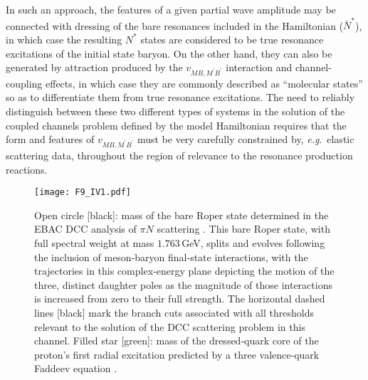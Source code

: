 In such an approach, the features of a given partial wave amplitude may be connected with dressing of the bare resonances included in the Hamiltonian ($\bar N^\ast$), in which case the resulting $N^\ast$ states are considered to be true resonance excitations of the initial state baryon.  On the other hand, they can also be generated by attraction produced by the $v_{MB,M^\prime B^\prime}$ interaction and channel-coupling effects, in which case they are commonly described as ``molecular states'' so as to differentiate them from true resonance excitations.  The need to reliably distinguish between these two different types of systems in the solution of the coupled channels problem defined by the model Hamiltonian requires that the form and features of $v_{MB,M^\prime B^\prime}$ must be very carefully constrained by,  \emph{e.g}.\ elastic scattering data, throughout the region of relevance to the resonance production reactions.

\begin{figure}[t]
\centerline{\texttt{[image: F9\_IV1.pdf]}}
\caption{\label{EBACRoper}
Open circle [black]: mass of the bare Roper state determined in the EBAC DCC analysis of $\pi N$ scattering \cite{JuliaDiaz:2007kz, Suzuki:2009nj, Kamano:2010ud}.
%
This bare Roper state, with full spectral weight at mass $1.763\,$GeV, splits and evolves following the inclusion of meson-baryon final-state interactions, with the trajectories in this complex-energy plane depicting the motion of the three, distinct daughter poles as the magnitude of those interactions is increased from zero to their full strength.
%
The horizontal dashed lines [black] mark the branch cuts associated with all thresholds relevant to the solution of the DCC scattering problem in this channel.
%
Filled star [green]: mass of the dressed-quark core of the proton's first radial excitation predicted by a three valence-quark Faddeev equation \cite{Segovia:2015hra}.
}
\end{figure}

